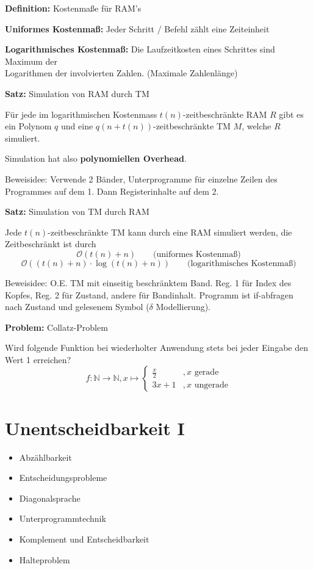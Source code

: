 \documentclass[a4paper,graphics,11pt]{article}
\begin{document}
\strut

\textbf{Definition:} Kostenmaße für RAM's

\textbf{Uniformes Kostenmaß:} Jeder Schritt / Befehl zählt eine Zeiteinheit

\textbf{Logarithmisches Kostenmaß:} Die Laufzeitkosten eines Schrittes sind Maximum der\\
Logarithmen der involvierten Zahlen. (Maximale Zahlenlänge)

\strut

\textbf{Satz:} Simulation von RAM durch TM

Für jede im logarithmischen Kostenmass $t(n)$-zeitbeschränkte RAM $R$ gibt es ein Polynom $q$
und eine $q(n + t(n))$-zeitbeschränkte TM $M$, welche $R$ simuliert.

Simulation hat also \textbf{polynomiellen Overhead}.

Beweisidee: Verwende 2 Bänder, Unterprogramme für einzelne Zeilen des Programmes auf dem 1.
Dann Registerinhalte auf dem 2.

\newpage

\textbf{Satz:} Simulation von TM durch RAM

Jede $t(n)$-zeitbeschränkte TM kann durch eine RAM simuliert werden,
die Zeitbeschränkt ist durch
$$
    \mathcal{O}(t(n)+n)\qquad \text{(uniformes Kostenmaß)}
$$$$
    \mathcal{O}((t(n)+n)\cdot \log(t(n)+n))
    \qquad \text{(logarithmisches Kostenmaß)}
$$

Beweisidee: O.E. TM mit einseitig beschränktem Band.
Reg. 1 für Index des Kopfes, Reg. 2 für Zustand, andere für Bandinhalt.
Programm ist if-abfragen nach Zustand und gelesenem Symbol ($\delta$ Modellierung).

\strut

\textbf{Problem:} Collatz-Problem

Wird folgende Funktion bei wiederholter Anwendung stets bei jeder Eingabe
den Wert 1 erreichen?
$$
    f : \mathbb{N} \to \mathbb{N}, x \mapsto
    \begin{cases}
        \frac{x}{2} &, x \text{ gerade}\\
        3x+1 &, x \text{ ungerade}
    \end{cases}
$$


\newpage

\section{Unentscheidbarkeit I}

\begin{itemize}
    \item Abzählbarkeit
    \item Entscheidungsprobleme
    \item Diagonalsprache
    \item Unterprogrammtechnik
    \item Komplement und Entscheidbarkeit
    \item Halteproblem
\end{itemize}
\end{document}
